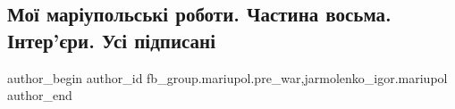  
 
 
 
 

\subsection{Мої маріупольські роботи. Частина восьма. Інтер'єри. Усі підписані}
\label{sec:18_02_2023.fb.fb_group.mariupol.pre_war.2.mo__mar_upolsk__robo}
 
\ifcmt
 author_begin
   author_id fb_group.mariupol.pre_war,jarmolenko_igor.mariupol
 author_end
\fi
